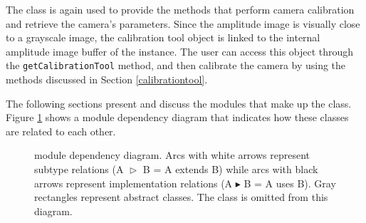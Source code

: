 The \CalibrationTool{} class is again used to provide the methods that perform camera calibration and retrieve
the camera's parameters. Since the amplitude image is visually close to a grayscale image, the calibration tool 
object is linked to the internal amplitude image buffer of the \SwissRangerCam{} instance. The user can 
access this object through the \texttt{get\-Cal\-i\-bra\-tion\-Tool} method, and then calibrate the camera by 
using the methods discussed in Section \ref{calibrationtool}.

The following sections present and discuss the modules that make up the \SwissRangerCam{} class. Figure 
\ref{swissrangercammoduledependency} shows a module dependency diagram that indicates how these 
classes are related to each other. 

\begin{figure}[t]
\begin{center}

\caption[\SwissRangerCam{}'s module dependency diagram]{\SwissRangerCam{} module dependency 
diagram. Arcs with white arrows represent subtype relations (A $\vartriangleright$ B = A extends B) while 
arcs with black arrows represent implementation relations (A $\blacktriangleright$ B = A uses B). Gray 
rectangles represent abstract classes. The \ImageBuffer{} class is omitted from this diagram.}
\label{swissrangercammoduledependency}
\end{center}
\end{figure}
